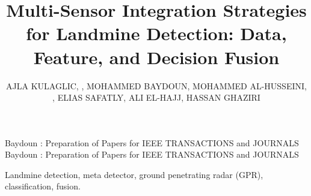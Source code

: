 \documentclass{ieeeaccess}
\begin{document}

\title{Multi-Sensor Integration Strategies for Landmine Detection: Data, Feature, and Decision Fusion}
\author{
\uppercase{Ajla Kulaglic}, ,
\uppercase{Mohammed Baydoun}, 
\uppercase{Mohammed Al-Husseini}, ,
\uppercase{Elias Safatly},
\uppercase{Ali El-Hajj},
\uppercase{Hassan Ghaziri}
}

\address[1]{College of Engineering and Technology, 
American University of the Middle East, Kuwait (e-mail: \{ajla.kulaglic, mohammed.al-husseini\}@aum.edu.kw)}
\address[2]{Makassed University of Beirut, Beirut, Lebanon (e-mail: mohbay@gmail.com, hassan.ghaziri@lebcsr.org)}
\address[3]{Electrical and Computer Engineering Department, American University of Beirut, Beirut, Lebanon (e-mail: elhajj@aub.edu.lb) }

\markboth
{Baydoun \headeretal: Preparation of Papers for IEEE TRANSACTIONS and JOURNALS}
{Baydoun \headeretal: Preparation of Papers for IEEE TRANSACTIONS and JOURNALS}



\begin{abstract}

\end{abstract}

\begin{keywords}
Landmine detection, meta detector, ground penetrating radar (GPR), classification, fusion.
\end{keywords}

\titlepgskip=-21pt

\maketitle
\end{document}
